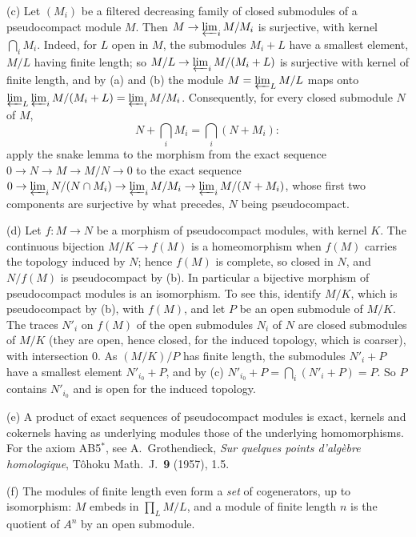 \label{sga3:VIIB:0.2.D}%
(c) Let \((M_i)\) be a filtered decreasing family of closed submodules of a pseudocompact module \(M\).
Then \(M\to\varprojlim_iM/M_i\) is surjective, with kernel \(\bigcap_iM_i\). Indeed, for \(L\) open in
\(M\), the submodules \(M_i+L\) have a smallest element, \(M/L\) having finite length; so
\(M/L\to\varprojlim_iM/(M_i+L)\) is surjective with kernel of finite length, and by (a) and (b) the
module \(M=\varprojlim_LM/L\) maps onto \(\varprojlim_L\varprojlim_iM/(M_i+L)=\varprojlim_iM/M_i\).
Consequently, for every closed submodule \(N\) of \(M\),
\[
  N+\bigcap_iM_i=\bigcap_i(N+M_i):
\]
apply the snake lemma to the morphism from the exact sequence \(0\to N\to M\to M/N\to0\) to the exact
sequence \(0\to\varprojlim_iN/(N\cap M_i)\to\varprojlim_iM/M_i\to\varprojlim_iM/(N+M_i)\), whose first
two components are surjective by what precedes, \(N\) being pseudocompact.

\label{sga3:vii:proposition:0-2-b}%
(d) Let \(f\colon M\to N\) be a morphism of pseudocompact modules, with kernel \(K\). The continuous
bijection \(M/K\to f(M)\) is a homeomorphism when \(f(M)\) carries the topology induced by \(N\); hence
\(f(M)\) is complete, so closed in \(N\), and \(N/f(M)\) is pseudocompact by (b). In particular a
bijective morphism of pseudocompact modules is an isomorphism. To see this, identify \(M/K\), which is
pseudocompact by (b), with \(f(M)\), and let \(P\) be an open submodule of \(M/K\). The traces \(N'_i\)
on \(f(M)\) of the open submodules \(N_i\) of \(N\) are closed submodules of \(M/K\) (they are open, hence
closed, for the induced topology, which is coarser), with intersection \(0\). As \((M/K)/P\) has finite length, the submodules \(N'_i+P\) have a smallest element
\(N'_{i_0}+P\), and by (c) \(N'_{i_0}+P=\bigcap_i(N'_i+P)=P\). So \(P\) contains \(N'_{i_0}\) and is
open for the induced topology.

(e) A product of exact sequences of pseudocompact modules is exact, kernels and cokernels having as
underlying modules those of the underlying homomorphisms. For the axiom AB5\(^*\), see A.~Grothendieck,
\emph{Sur quelques points d'alg\`ebre homologique}, T\^ohoku Math.\ J.\ \textbf{9} (1957), 1.5.

(f) The modules of finite length even form a \emph{set} of cogenerators, up to isomorphism: \(M\) embeds
in \(\prod_LM/L\), and a module of finite length \(n\) is the quotient of \(A^n\) by an open
submodule.

